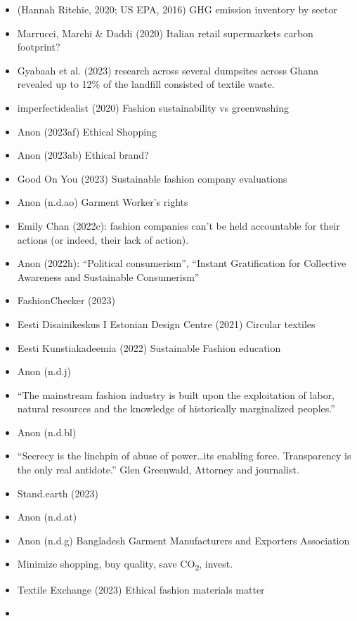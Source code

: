 \documentclass[
  letterpaper,
  DIV=11,
  numbers=noendperiod]{scrartcl}
\begin{document}
\begin{itemize}
\item
  (Hannah Ritchie, 2020; US EPA, 2016) GHG emission inventory by sector
\item
  Marrucci, Marchi \& Daddi (2020) Italian retail supermarkets carbon
  footprint?
\item
  Gyabaah et al. (2023) research across several dumpsites across Ghana
  revealed up to 12\% of the landfill consisted of textile waste.
\item
  imperfectidealist (2020) Fashion sustainability vs greenwashing
\item
  Anon (2023af) Ethical Shopping
\item
  Anon (2023ab) Ethical brand?
\item
  Good On You (2023) Sustainable fashion company evaluations
\item
  Anon (n.d.ao) Garment Worker's rights
\item
  Emily Chan (2022c): fashion companies can't be held accountable for
  their actions (or indeed, their lack of action).
\item
  Anon (2022h): ``Political consumerism'', ``Instant Gratification for
  Collective Awareness and Sustainable Consumerism''
\item
  FashionChecker (2023)
\item
  Eesti Disainikeskus I Estonian Design Centre (2021) Circular textiles
\item
  Eesti Kunstiakadeemia (2022) Sustainable Fashion education
\item
  Anon (n.d.j)
\item
  ``The mainstream fashion industry is built upon the exploitation of
  labor, natural resources and the knowledge of historically
  marginalized peoples.''
\item
  Anon (n.d.bl)
\item
  ``Secrecy is the linchpin of abuse of power\ldots its enabling force.
  Transparency is the only real antidote.'' Glen Greenwald, Attorney and
  journalist.
\item
  Stand.earth (2023)
\item
  Anon (n.d.at)
\item
  Anon (n.d.g) Bangladesh Garment Manufacturers and Exporters
  Association
\item
  Minimize shopping, buy quality, save CO\textsubscript{2}, invest.
\item
  Textile Exchange (2023) Ethical fashion materials matter
\item

\end{itemize}
\end{document}
